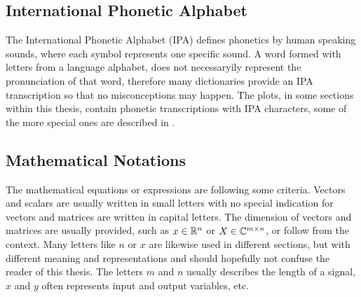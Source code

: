 
\subsection{International Phonetic Alphabet}\label{sec:intro_overview_ipa}
The International Phonetic Alphabet (IPA) defines phonetics by human speaking sounds, where each symbol represents one specific sound.
A word formed with letters from a language alphabet, does not necessaryily represent the pronunciation of that word, therefore many dictionaries provide an IPA transcription so that no misconceptions may happen.
The plots, in some sections within this thesis, contain phonetic transcriptions with IPA characters, some of the more special ones are described in .



\subsection{Mathematical Notations}\label{sec:intro_overview_math}
The mathematical equations or expressions are following some criteria.
Vectors and scalars are usually written in small letters with no special indication for vectors and matrices are written in capital letters.
The dimension of vectors and matrices are usually provided, such as $x\in\mathbb{R}^n$ or $X\in\mathbb{C}^{m \times n}$, or follow from the context.
Many letters like $n$ or $x$ are likewise used in different sections, but with different meaning and representations and should hopefully not confuse the reader of this thesis.
The letters $m$ and $n$ usually describes the length of a signal, $x$  and $y$ often represents input and output variables, etc.